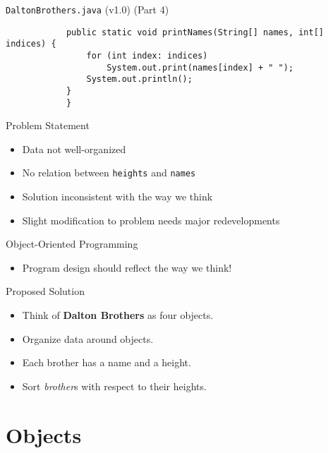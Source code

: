 \documentclass[10pt, compress]{beamer}
\begin{document}
\begin{slide}
	\begin{block}{\texttt{DaltonBrothers.java} (v1.0) (Part 4)}
		\begin{verbatim}
			public static void printNames(String[] names, int[] indices) {
			    for (int index: indices)
			        System.out.print(names[index] + " ");
			    System.out.println();
			}
			}
		\end{verbatim}
	\end{block}
\end{slide}

\begin{slide}
	\begin{block}{Problem Statement}
		\begin{itemize}
			\item[] Data not well-organized
			\item[] No relation between \texttt{heights} and \texttt{names}
			\item[] Solution inconsistent with the way we think
			\item[] Slight modification to problem needs major redevelopments
		\end{itemize}
	\end{block}
\end{slide}

\begin{slide}
	\begin{block}{Object-Oriented Programming}
		\begin{itemize}
			\item[] Program design should reflect the way we think!
		\end{itemize}
	\end{block}
	\begin{block}{Proposed Solution}
		\begin{itemize}
			\item[] Think of \textbf{Dalton Brothers} as four objects.
			\item[] Organize data around objects.
			\item[] Each brother has a name and a height.
			\item[] Sort \emph{brother}s with respect to their heights.
		\end{itemize}
	\end{block}
\end{slide}

\section{Objects}
\end{document}
